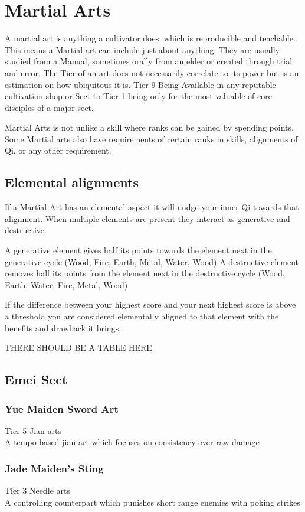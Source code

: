 \section{Martial Arts}
A martial art is anything a cultivator does, which is reproducible and teachable. This means a Martial art can include just about anything. 
They are usually studied from a Manual, sometimes orally from an elder or created through trial and error. 
The Tier of an art does not necessarily correlate to its power but is an estimation on how ubiquitous it is. 
Tier 9 Being Available in any reputable cultivation shop or Sect to Tier 1 being only for the most valuable of core disciples of a major sect.

Martial Arts is not unlike a skill where ranks can be gained by spending points. 
Some Martial arts also have requirements of certain ranks in skills, alignments of Qi, or any other requirement. 

\subsection{Elemental alignments}
If a Martial Art has an elemental aspect it will nudge your inner Qi towards that alignment. 
When multiple elements are present they interact as generative and destructive.

A generative element gives half its points towards the element next in the generative cycle (Wood, Fire, Earth, Metal, Water, Wood)
A destructive element removes half its points from the element next in the destructive cycle (Wood, Earth, Water, Fire, Metal, Wood)

If the difference between your highest score and your next highest score is above a threshold you are considered elementally aligned to that element 
with the benefits and drawback it brings. 

THERE SHOULD BE A TABLE HERE


\subsection{Emei Sect}
\subsubsection{Yue Maiden Sword Art}
Tier 5 Jian arts\\
A tempo based jian art which focuses on consistency over raw damage

\subsubsection{Jade Maiden's Sting}
Tier 3 Needle arts\\
A controlling counterpart which punishes short range enemies with poking strikes

